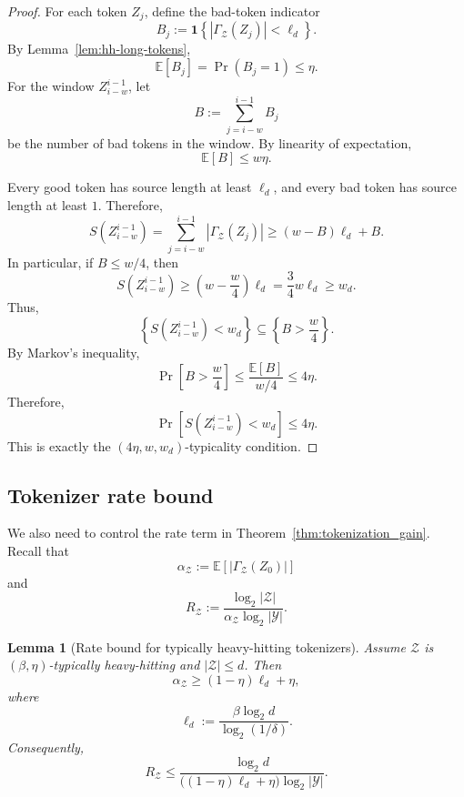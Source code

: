 \documentclass{article}
\theoremstyle{plain}
\newtheorem{lemma}[theorem]{Lemma}
\theoremstyle{definition}
\theoremstyle{remark}
\begin{document}
    \begin{proof}
    For each token $Z_j$, define the bad-token indicator
    \[
        B_j
        :=
        \mathbf 1\left\{
            |\Gamma_{\mathcal Z}(Z_j)|<\ell_d
        \right\}.
    \]
    By Lemma~\ref{lem:hh-long-tokens},
    \[
        \mathbb E[B_j]=\Pr(B_j=1)\le \eta.
    \]
    For the window $Z_{i-w}^{i-1}$, let
    \[
        B
        :=
        \sum_{j=i-w}^{i-1}B_j
    \]
    be the number of bad tokens in the window. By linearity of expectation,
    \[
        \mathbb E[B]\le w\eta.
    \]
    
    Every good token has source length at least $\ell_d$, and every bad token has
    source length at least $1$. Therefore,
    \[
        S(Z_{i-w}^{i-1})
        =
        \sum_{j=i-w}^{i-1}|\Gamma_{\mathcal Z}(Z_j)|
        \ge
        (w-B)\ell_d + B.
    \]
    In particular, if $B\le w/4$, then
    \[
        S(Z_{i-w}^{i-1})
        \ge
        \left(w-\frac{w}{4}\right)\ell_d
        =
        \frac{3}{4}w\ell_d
        \ge
        w_d.
    \]
    Thus,
    \[
        \left\{
            S(Z_{i-w}^{i-1}) < w_d
        \right\}
        \subseteq
        \left\{
            B>\frac{w}{4}
        \right\}.
    \]
    By Markov's inequality,
    \[
        \Pr\!\left[
            B>\frac{w}{4}
        \right]
        \le
        \frac{\mathbb E[B]}{w/4}
        \le
        4\eta.
    \]
    Therefore,
    \[
        \Pr\!\left[
            S(Z_{i-w}^{i-1}) < w_d
        \right]
        \le
        4\eta.
    \]
    This is exactly the $\left(4\eta,w,w_d\right)$-typicality condition.
    \end{proof}
    
    \subsection{Tokenizer rate bound}
    
    We also need to control the rate term in Theorem~\ref{thm:tokenization_gain}.
    Recall that
    \[
        \alpha_{\mathcal Z}
        :=
        \mathbb E\!\left[
            |\Gamma_{\mathcal Z}(Z_0)|
        \right]
    \]
    and
    \[
        R_{\mathcal Z}
        :=
        \frac{\log_2|\mathcal Z|}
             {\alpha_{\mathcal Z}\log_2|\mathcal Y|}.
    \]
    
    \begin{lemma}[Rate bound for typically heavy-hitting tokenizers]
    \label{lem:hh-rate-bound}
    Assume $\mathcal Z$ is $(\beta,\eta)$-typically heavy-hitting and
    $|\mathcal Z|\le d$. Then
    \[
        \alpha_{\mathcal Z}
        \ge
        (1-\eta)\ell_d+\eta,
    \]
    where
    \[
        \ell_d
        :=
        \frac{\beta\log_2 d}{\log_2(1/\delta)}.
    \]
    Consequently,
    \[
        R_{\mathcal Z}
        \le
        \frac{\log_2 d}
             {\big((1-\eta)\ell_d+\eta\big)\log_2|\mathcal Y|}.
    \]
    \end{lemma}
    
\end{document}
